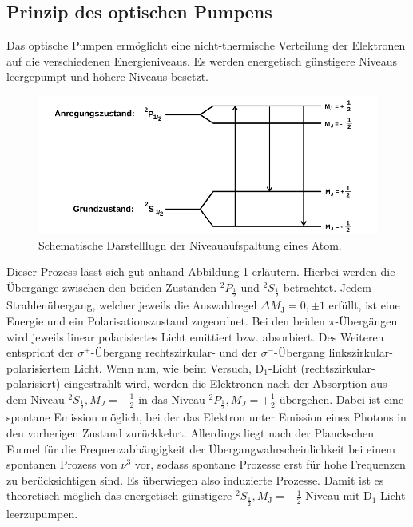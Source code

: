 \subsection{Prinzip des optischen Pumpens}
Das optische Pumpen ermöglicht eine nicht-thermische Verteilung der
Elektronen auf die verschiedenen Energieniveaus. Es werden energetisch
günstigere Niveaus leergepumpt und höhere Niveaus besetzt.
\begin{figure}
  \centering
  \includegraphics[width=0.9\columnwidth]{pictures/niveaus.png}
  \caption{Schematische Darstelllugn der Niveauaufspaltung eines Atom.\cite{Anleitung}}
  \label{fig:übergaenge_alkali}
\end{figure}
Dieser Prozess lässt sich gut anhand Abbildung \ref{fig:übergaenge_alkali}
erläutern.
Hierbei werden die Übergänge zwischen den beiden Zuständen $^2P_{\frac{1}{2}}$ und $^2S_{\frac{1}{2}}$ betrachtet.
Jedem Strahlenübergang, welcher jeweils die Auswahlregel $\Delta M_{\mathrm{J}} = 0, \pm 1$ erfüllt, ist eine Energie und ein Polarisationszustand zugeordnet.
Bei den beiden $\pi$-Übergängen wird jeweils linear polarisiertes Licht
emittiert bzw. absorbiert. Des Weiteren entspricht der $\sigma^+$-Übergang
rechtszirkular- und der $\sigma^-$-Übergang linkszirkular-polarisiertem Licht.
Wenn nun, wie beim Versuch, D$_1$-Licht (rechtszirkular-polarisiert)
eingestrahlt wird, werden die Elektronen nach der Absorption aus
dem Niveau $^2S_{\frac{1}{2}}, M_J = -\frac{1}{2}$ in das Niveau
$^2P_{\frac{1}{2}}, M_J = +\frac{1}{2}$ übergehen. Dabei ist eine
spontane Emission möglich, bei der das Elektron unter Emission eines
Photons in den vorherigen Zustand zurückkehrt. Allerdings liegt nach
der Planckschen Formel für die Frequenzabhängigkeit der
Übergangwahrscheinlichkeit bei einem spontanen Prozess von $\nu^3$ vor, sodass
spontane Prozesse erst für hohe Frequenzen zu berücksichtigen sind.
Es überwiegen also induzierte Prozesse. Damit ist es theoretisch möglich
das energetisch günstigere  $^2S_{\frac{1}{2}}, M_{\mathrm{J}} = -\frac{1}{2}$ Niveau
mit D$_1$-Licht leerzupumpen.

